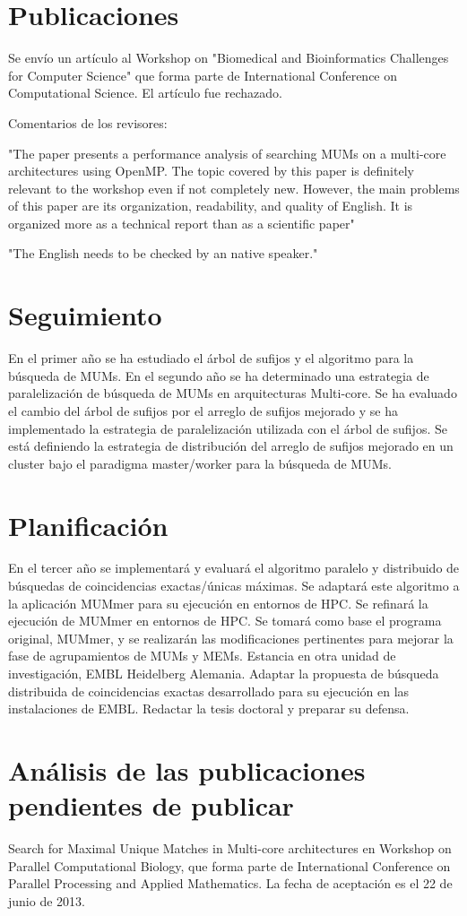 \documentclass[12pt,a4paper]{article}
\begin{document}
\section{Publicaciones}
Se envío un artículo al Workshop on "Biomedical and Bioinformatics Challenges for Computer Science" que forma parte de International Conference on Computational Science. El artículo fue rechazado.

Comentarios de los revisores:

"The paper presents a performance analysis of searching MUMs on a multi-core architectures using OpenMP. The topic covered by this paper is definitely relevant to the workshop even if not completely new. However, the main problems of this paper are its organization, readability, and quality of English. It is organized more as a technical report than as a scientific paper"

"The English needs to be checked by an native speaker."
\section{Seguimiento}
En el primer año se ha estudiado el árbol de sufijos y el algoritmo para la búsqueda de MUMs.
En el segundo año se ha determinado una estrategia de paralelización de búsqueda de MUMs en arquitecturas Multi-core. Se ha evaluado el cambio del árbol de sufijos por el arreglo de sufijos mejorado y se ha implementado la estrategia de paralelización utilizada con el árbol de sufijos. Se está definiendo la estrategia de distribución del arreglo de sufijos mejorado en un cluster bajo el paradigma master/worker para la búsqueda de MUMs.
\section{Planificación}
En el tercer año se implementará y evaluará   el algoritmo paralelo y distribuido de búsquedas de 
coincidencias exactas/únicas máximas. 
Se adaptará este algoritmo a la aplicación MUMmer para su ejecución en entornos de HPC.
Se refinará la ejecución de MUMmer en entornos de HPC. Se tomará como base el programa original, MUMmer, y 
se realizarán las modificaciones pertinentes para mejorar la fase de agrupamientos de MUMs y MEMs. 
Estancia en otra unidad de investigación, EMBL Heidelberg Alemania. Adaptar la propuesta de búsqueda distribuida de coincidencias exactas desarrollado para su ejecución en las instalaciones de EMBL. 
Redactar la tesis doctoral y preparar su defensa.
\section{Análisis de las publicaciones pendientes de publicar}
Search for Maximal Unique Matches in Multi-core architectures en Workshop on Parallel Computational Biology, que forma parte de International Conference on Parallel Processing and Applied Mathematics. La fecha de aceptación es el 22 de junio de 2013.
\end{document}
